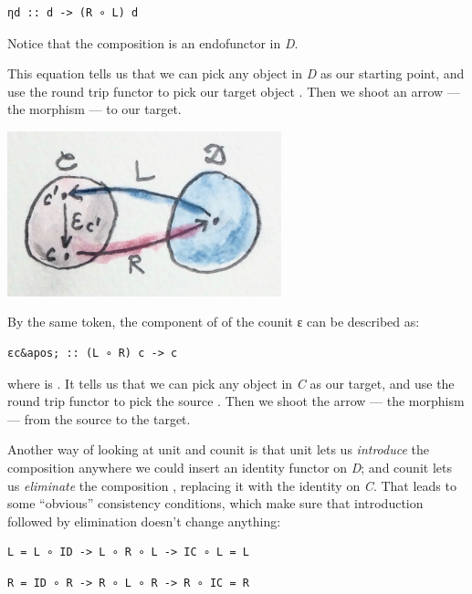 \begin{verbatim}
ηd :: d -> (R ∘ L) d
\end{verbatim}

Notice that the composition  is an endofunctor in \emph{D}.

This equation tells us that we can pick any object  in
\emph{D} as our starting point, and use the round trip functor
 to pick our target object . Then we
shoot an arrow --- the morphism  --- to our target.

\includegraphics[width=3.12500in]{images/adj-counit.jpg}

By the same token, the component of of the counit ε can be described as:

\begin{verbatim}
εc&apos; :: (L ∘ R) c -> c
\end{verbatim}

where  is . It tells us that we
can pick any object  in \emph{C} as our target, and use the
round trip functor  to pick the source
. Then we shoot the arrow --- the morphism
 --- from the source to the target.

Another way of looking at unit and counit is that unit lets us
\emph{introduce} the composition  anywhere we could
insert an identity functor on \emph{D}; and counit lets us
\emph{eliminate} the composition , replacing it with the
identity on \emph{C}. That leads to some ``obvious'' consistency
conditions, which make sure that introduction followed by elimination
doesn't change anything:

\begin{verbatim}
L = L ∘ ID -> L ∘ R ∘ L -> IC ∘ L = L
\end{verbatim}

\begin{verbatim}
R = ID ∘ R -> R ∘ L ∘ R -> R ∘ IC = R
\end{verbatim}

